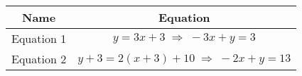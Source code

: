 \begin{tabular}{|c|c|}
\hline
\textbf{Name} & \textbf{Equation} \\
\hline
Equation 1 & $y = 3x + 3 \;\Rightarrow\; -3x + y = 3$ \\ \hline
Equation 2 & $y + 3 = 2(x+3) + 10 \;\Rightarrow\; -2x + y = 13$ \\ \hline
\end{tabular}